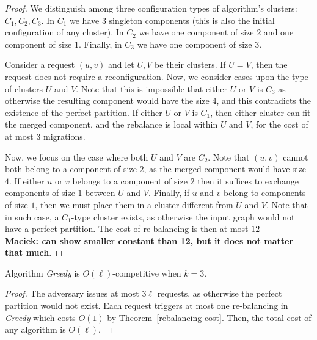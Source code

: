\documentclass[manuscript,screen=true]{acmart}
\newcommand\maciek[1]{\color{brown}\textbf{\\ Maciek: #1}\color{black}}
\begin{document}
\begin{proof} 
  
  We distinguish among three configuration types of algorithm's clusters: $C_1, C_2, C_3$. In $C_1$ we have $3$ singleton components (this is also the initial configuration of any cluster). In $C_2$ we have one component of size $2$ and one component of size $1$. Finally, in $C_3$ we have one component of size $3$.

  Consider a request $(u, v)$ and let $U, V$ be their clusters.
  If $U=V$, then the request does not require a reconfiguration.
  Now, we consider cases upon the type of clusters $U$ and $V$.
  Note that this is impossible that either $U$ or $V$ is $C_3$ as otherwise the resulting component would have the size $4$, and this contradicts the existence of the perfect partition.
  If either $U$ or $V$ is $C_1$, then either cluster can fit the merged component, and the rebalance is local within $U$ and $V$, for the cost of at most $3$ migrations.

  Now, we focus on the case where both $U$ and $V$ are $C_2$. Note that $(u,v)$ cannot both belong to a component of size $2$, as the merged component would have size $4$.
  If either $u$ or $v$ belongs to a component of size $2$ then it suffices to exchange components of size $1$ between $U$ and $V$.
  Finally, if $u$ and $v$ belong to components of size $1$, then we must place them in a cluster different from $U$ and $V$.
  Note that in such case, a $C_1$-type cluster exists, as otherwise the input graph would not have a perfect partition. The cost of re-balancing is then at most $12$ \maciek{can show smaller constant than 12, but it does not matter that much}.
\end{proof}

  
\begin{theorem}
	Algorithm \emph{Greedy} is $O(\ell)$-competitive when $k=3$.
\end{theorem}

\begin{proof}
	The adversary issues at most $3\ell$ requests, as otherwise the perfect partition would not exist.
	Each request triggers at most one re-balancing in \emph{Greedy}
	which costs $O(1)$ by Theorem~\ref{rebalancing-cost}.
	Then,
	the total cost of any algorithm is $O(\ell)$.
\end{proof}
\end{document}
